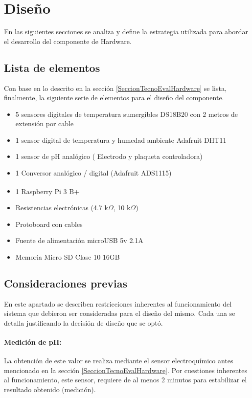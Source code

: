         
\section{Diseño}
    \par En las siguientes secciones se analiza y define la estrategia utilizada para abordar el desarrollo del componente de Hardware.
    
    \subsection{Lista de elementos}
    \label{subsectionListaElemHard}
    Con base en lo descrito en la sección \ref{SeccionTecnoEvalHardware} se lista, finalmente, la siguiente serie de elementos para el diseño del componente.
        \begin{itemize}
            \item 5 sensores digitales de temperatura sumergibles DS18B20 con 2 metros de extensión por cable
            \item 1 sensor digital de temperatura y humedad ambiente Adafruit DHT11
            \item 1 sensor de pH analógico ( Electrodo y plaqueta controladora)
            \item 1 Conversor analógico / digital (Adafruit ADS1115)
            \item 1 Raspberry\textsuperscript{\textregistered} Pi 3 B+
            \item Resistencias electrónicas (4.7 k$\Omega$, 10 k$\Omega$)
            \item Protoboard con cables
            \item Fuente de alimentación microUSB 5v 2.1A
            \item Memoria Micro SD Clase 10 16GB
        \end{itemize}
        
    \subsection{Consideraciones previas}
    \label{subseccionConsideracionesPreviasSensores}
        \par En este apartado se describen restricciones inherentes al funcionamiento del sistema que debieron ser consideradas para el diseño del mismo. Cada una se detalla justificando la decisión de diseño que se optó.
        
        \paragraph{Medición de pH:} 
            La obtención de este valor se realiza mediante el sensor electroquímico antes mencionado en la sección \ref{SeccionTecnoEvalHardware}. Por cuestiones inherentes al funcionamiento, este sensor, requiere de al menos 2 minutos para estabilizar el resultado obtenido (medición).

